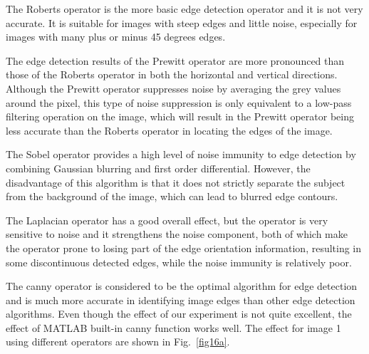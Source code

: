 \documentclass[hyperref]{article}
\theoremstyle{nonumberplain}
\begin{document}
	\hspace{1.0em}
	The Roberts operator is the more basic edge detection operator and it is not very accurate. It is suitable  for images with steep edges and little noise, especially for images with many plus or minus 45 degrees edges.
	
	The edge detection results of the Prewitt operator are more pronounced than those of the Roberts operator in both the horizontal and vertical directions. Although the Prewitt operator suppresses noise by averaging the grey values around the pixel, this type of noise suppression is only equivalent to a low-pass filtering operation on the image, which will result in the Prewitt operator being less accurate than the Roberts operator in locating the edges of the image. 
	
	The Sobel operator provides a high level of noise immunity to edge detection by combining Gaussian blurring and first order differential. However, the disadvantage of this algorithm is that it does not strictly separate the subject from the background of the image, which can lead to blurred edge contours. 
	
	The Laplacian operator has a good overall effect, but the operator is very sensitive to noise and it strengthens the noise component, both of which make the operator prone to losing part of the edge orientation information, resulting in some discontinuous detected edges, while the noise immunity is relatively poor.
	
	The canny operator is considered to be the optimal algorithm for edge detection and is much more accurate in identifying image edges than other edge detection algorithms. Even though the effect of our experiment is not quite excellent, the effect of MATLAB built-in canny function works well. The effect for image 1 using different operators are shown in Fig.~\ref{fig16a}.
	
\end{document}
